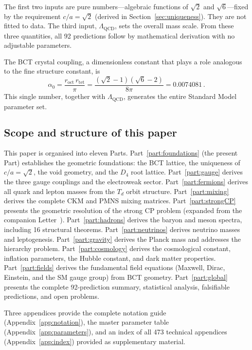 \documentclass[review,number,sort&compress]{elsarticle}
\newcommand{\roct}{r_{\mathrm{oct}}}
\newcommand{\rtet}{r_{\mathrm{tet}}}
\newcommand{\azero}{\alpha_0}
\newcommand{\LQCD}{\Lambda_{\mathrm{QCD}}}
\newcommand{\Td}{T_d}
\newcommand{\Dfour}{D_4}
\begin{document}
The first two inputs are pure numbers---algebraic functions of $\sqrt{2}$ and
$\sqrt{6}$---fixed by the requirement $c/a = \sqrt{2}$ (derived in
Section~\ref{sec:uniqueness}). They are not fitted to data. The third input,
$\LQCD$, sets the overall mass scale. From these three quantities, all 92
predictions follow by mathematical derivation with no adjustable parameters.

The BCT crystal coupling, a dimensionless constant that plays a role
analogous to the fine structure constant, is
\begin{equation}
  \azero = \frac{\roct\,\rtet}{\pi}
  = \frac{(\sqrt{2}-1)(\sqrt{6}-2)}{8\pi}
  = 0.0074081\,.
  \label{eq:alpha0_def}
\end{equation}
This single number, together with $\LQCD$, generates the entire Standard
Model parameter set.

\subsection{Scope and structure of this paper}

This paper is organised into eleven Parts. Part~\ref{part:foundations}
(the present Part) establishes the geometric foundations: the BCT lattice,
the uniqueness of $c/a = \sqrt{2}$, the void geometry, and the $\Dfour$
root lattice. Part~\ref{part:gauge} derives the three gauge couplings
and the electroweak sector. Part~\ref{part:fermions} derives all quark
and lepton masses from the $\Td$ orbit structure. Part~\ref{part:mixing}
derives the complete CKM and PMNS mixing matrices.
Part~\ref{part:strongCP} presents the geometric resolution of the strong CP
problem (expanded from the companion Letter~\cite{BCTstrongCP}).
Part~\ref{part:hadrons} derives the baryon and meson spectra, including
16 structural theorems. Part~\ref{part:neutrinos} derives neutrino masses
and leptogenesis. Part~\ref{part:gravity} derives the Planck mass and
addresses the hierarchy problem. Part~\ref{part:cosmology} derives the
cosmological constant, inflation parameters, the Hubble constant, and
dark matter properties. Part~\ref{part:fields} derives the fundamental
field equations (Maxwell, Dirac, Einstein, and the SM gauge group) from
BCT geometry. Part~\ref{part:global} presents the complete 92-prediction
summary, statistical analysis, falsifiable predictions, and open problems.

Three appendices provide the complete notation guide
(Appendix~\ref{app:notation}), the master parameter table
(Appendix~\ref{app:parameters}), and an index of all 473 technical
appendices (Appendix~\ref{app:index}) provided as supplementary material.
\end{document}
